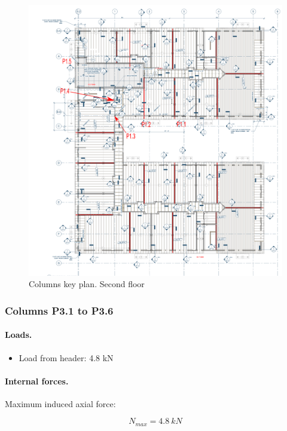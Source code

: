 \begin{figure}
  \begin{center}
  \includegraphics[width=120mm]{figures/columns/columns_key_plan_2nd_floor}
  \end{center}
  \caption{Columns key plan. Second floor}\label{fg_columns_key_plan_2nd_floor}
\end{figure}

\subsubsection{Columns P3.1 to P3.6}

\paragraph{Loads.}

\begin{itemize}
\item Load from header: 4.8 kN
\end{itemize}

\paragraph{Internal forces.}

\noindent Maximum induced axial force:

\begin{equation}
  N_{max}= 4.8\ kN
\end{equation}

